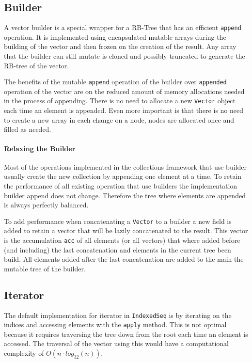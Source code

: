 \subsection{Builder}
\label{builder}
A vector builder is a special wrapper for a RB-Tree that has an efficient \texttt{append} operation. It is implemented using encapsulated mutable arrays during the building of the vector and then frozen on the creation of the result. Any array that the builder can still mutate is cloned and possibly truncated to generate the RB-tree of the vector. 

The benefits of the mutable \texttt{append} operation of the builder over \texttt{appended} operation of the vector are on the reduced amount of memory allocations needed in the process of appending. There is no need to allocate a new \texttt{Vector} object each time an element is appended. Even more important is that there is no need to create a new array in each change on a node, nodes are allocated once and filled as needed. 

\paragraph{Relaxing the Builder}
Most of the operations implemented in the collections framework that use builder usually create the new collection by appending one element at a time. To retain the performance of all existing operation that use builders the implementation builder append does not change. Therefore the tree where elements are appended is always perfectly balanced.
 
 To add performance when concatenating a \texttt{Vector} to a builder a new field is added to retain a vector that will be lazily concatenated to the result. This vector is the accumulation \texttt{acc} of all elements (or all vectors) that where added before (and including) the last concatenation and elements in the current tree been build. All elements added after the last concatenation are added to the main the mutable tree of the builder.


\subsection{Iterator}
\label{iterator}
The default implementation for iterator in \texttt{IndexedSeq} is by iterating on the indices and accessing elements with the \texttt{apply} method. This is not optimal because it requires traversing the tree down from the root each time an element is accessed. The traversal of the vector using this would have a computational complexity of $O(n \cdot log_{32}(n))$.

